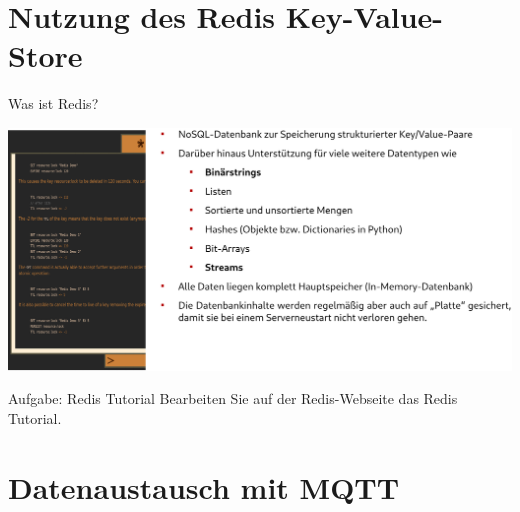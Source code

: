 \section{Nutzung des Redis Key-Value-Store}

\begin{frame}{Was ist Redis?}
    \begin{adjustwidth}{-4ex}{-4ex}
        \includegraphics[width=\linewidth]{06-architektur/img/redis}
    \end{adjustwidth}
\end{frame}

\begin{frame}{Aufgabe: Redis Tutorial}
    Bearbeiten Sie auf der Redis-Webseite das Redis Tutorial.
\end{frame}

\section{Datenaustausch mit MQTT}

